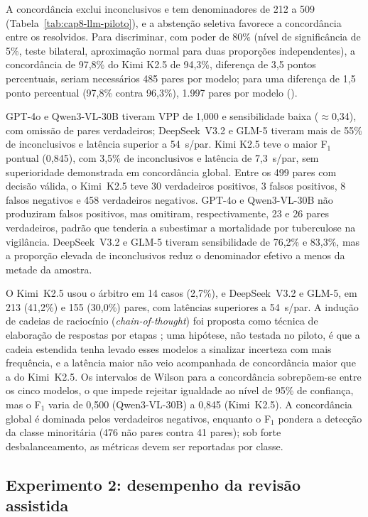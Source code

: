 A concordância exclui inconclusivos e tem denominadores de 212 a 509 (Tabela~\ref{tab:cap8-llm-piloto}), e a abstenção seletiva favorece a concordância entre os resolvidos. Para discriminar, com poder de 80\% (nível de significância de 5\%, teste bilateral, aproximação normal para duas proporções independentes), a concordância de 97,8\% do Kimi K2.5 de 94,3\%, diferença de 3,5 pontos percentuais, seriam necessários 485 pares por modelo; para uma diferença de 1,5 ponto percentual (97,8\% contra 96,3\%), 1.997 pares por modelo ().

GPT-4o e Qwen3-VL-30B tiveram VPP de 1,000 e sensibilidade baixa ($\approx$0,34), com omissão de pares verdadeiros; DeepSeek~V3.2 e GLM-5 tiveram mais de 55\% de inconclusivos e latência superior a 54~s/par. Kimi K2.5 teve o maior F$_1$ pontual (0,845), com 3,5\% de inconclusivos e latência de 7,3~s/par, sem superioridade demonstrada em concordância global. Entre os 499 pares com decisão válida, o Kimi~K2.5 teve 30 verdadeiros positivos, 3 falsos positivos, 8 falsos negativos e 458 verdadeiros negativos. GPT-4o e Qwen3-VL-30B não produziram falsos positivos, mas omitiram, respectivamente, 23 e 26 pares verdadeiros, padrão que tenderia a subestimar a mortalidade por tuberculose na vigilância. DeepSeek~V3.2 e GLM-5 tiveram sensibilidade de 76,2\% e 83,3\%, mas a proporção elevada de inconclusivos reduz o denominador efetivo a menos da metade da amostra.

O Kimi~K2.5 usou o árbitro em 14 casos (2,7\%), e DeepSeek~V3.2 e GLM-5, em 213 (41,2\%) e 155 (30,0\%) pares, com latências superiores a 54~s/par. A indução de cadeias de raciocínio (\textit{chain-of-thought}) foi proposta como técnica de elaboração de respostas por etapas \cite{Wei2022chainofthought}; uma hipótese, não testada no piloto, é que a cadeia estendida tenha levado esses modelos a sinalizar incerteza com mais frequência, e a latência maior não veio acompanhada de concordância maior que a do Kimi~K2.5. Os intervalos de Wilson para a concordância sobrepõem-se entre os cinco modelos, o que impede rejeitar igualdade ao nível de 95\% de confiança, mas o F$_1$ varia de 0,500 (Qwen3-VL-30B) a 0,845 (Kimi~K2.5). A concordância global é dominada pelos verdadeiros negativos, enquanto o F$_1$ pondera a detecção da classe minoritária (476 não pares contra 41 pares); sob forte desbalanceamento, as métricas devem ser reportadas por classe.

\subsection{Experimento 2: desempenho da revisão assistida}
\label{sec:e4-exp2}

